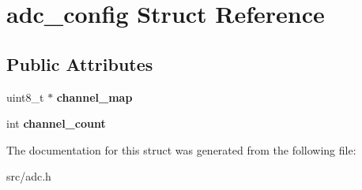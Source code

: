 \hypertarget{structadc__config}{}\section{adc\+\_\+config Struct Reference}
\label{structadc__config}
\subsection*{Public Attributes}
\begin{DoxyCompactItemize}
\item 
\hypertarget{structadc__config_a7f7cc3ba237533dd943faddca7555430}{}uint8\+\_\+t $\ast$ {\bfseries channel\+\_\+map}\label{structadc__config_a7f7cc3ba237533dd943faddca7555430}

\item 
\hypertarget{structadc__config_a33bd54712a72f2dcbd6c3d6d53b776ea}{}int {\bfseries channel\+\_\+count}\label{structadc__config_a33bd54712a72f2dcbd6c3d6d53b776ea}

\end{DoxyCompactItemize}


The documentation for this struct was generated from the following file\+:\begin{DoxyCompactItemize}
\item 
src/adc.\+h\end{DoxyCompactItemize}
